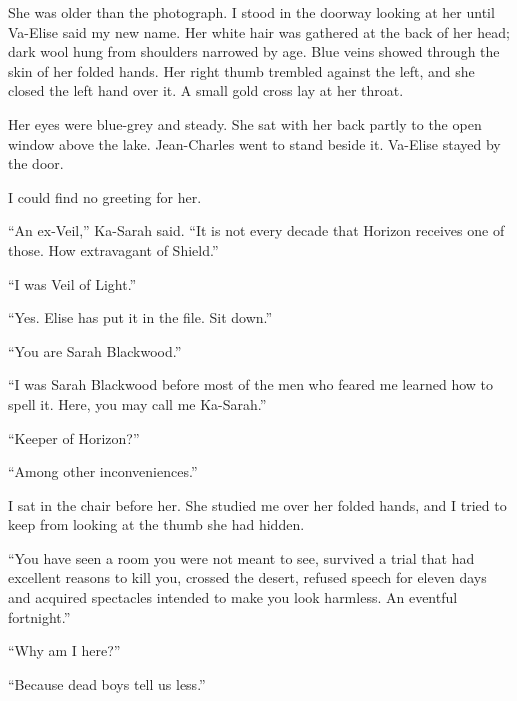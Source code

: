 She was older than the photograph. I stood in the doorway looking at her until Va-Elise said my new name. Her white hair was gathered at the back of her head; dark wool hung from shoulders narrowed by age. Blue veins showed through the skin of her folded hands. Her right thumb trembled against the left, and she closed the left hand over it. A small gold cross lay at her throat.\par

Her eyes were blue-grey and steady. She sat with her back partly to the open window above the lake. Jean-Charles went to stand beside it. Va-Elise stayed by the door.\par

I could find no greeting for her.\par

``An ex-Veil,'' Ka-Sarah said. ``It is not every decade that Horizon receives one of those. How extravagant of Shield.''\par

``I was Veil of Light.''\par

``Yes. Elise has put it in the file. Sit down.''\par

``You are Sarah Blackwood.''\par

``I was Sarah Blackwood before most of the men who feared me learned how to spell it. Here, you may call me Ka-Sarah.''\par

``Keeper of Horizon?''\par

``Among other inconveniences.''\par

I sat in the chair before her. She studied me over her folded hands, and I tried to keep from looking at the thumb she had hidden.\par

``You have seen a room you were not meant to see, survived a trial that had excellent reasons to kill you, crossed the desert, refused speech for eleven days and acquired spectacles intended to make you look harmless. An eventful fortnight.''\par

``Why am I here?''\par

``Because dead boys tell us less.''\par

